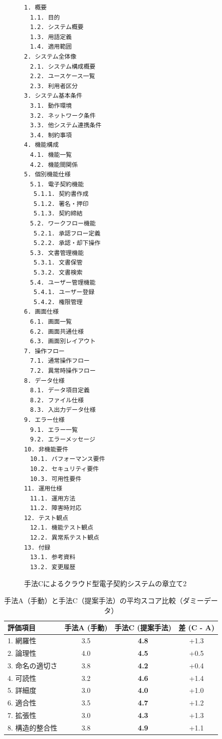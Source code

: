 \begin{figure}[htbp]
\begin{tcolorbox}[
  colback=white,
  colframe=black,
  fonttitle=\bfseries
]
\begin{multicols}{2}
\footnotesize
\ttfamily
\fontsize{11}{12}\selectfont
\begin{verbatim}
1. 概要
　1.1. 目的
　1.2. システム概要
　1.3. 用語定義
　1.4. 適用範囲
2. システム全体像
　2.1. システム構成概要
　2.2. ユースケース一覧
　2.3. 利用者区分
3. システム基本条件
　3.1. 動作環境
　3.2. ネットワーク条件
　3.3. 他システム連携条件
　3.4. 制約事項
4. 機能構成
　4.1. 機能一覧
　4.2. 機能間関係
5. 個別機能仕様
　5.1. 電子契約機能
 　5.1.1. 契約書作成
 　5.1.2. 署名・押印
 　5.1.3. 契約締結
　5.2. ワークフロー機能
 　5.2.1. 承認フロー定義
 　5.2.2. 承認・却下操作
　5.3. 文書管理機能
 　5.3.1. 文書保管
 　5.3.2. 文書検索
　5.4. ユーザー管理機能
 　5.4.1. ユーザー登録
 　5.4.2. 権限管理
6. 画面仕様
　6.1. 画面一覧
　6.2. 画面共通仕様
　6.3. 画面別レイアウト
7. 操作フロー
　7.1. 通常操作フロー
　7.2. 異常時操作フロー
8. データ仕様
　8.1. データ項目定義
　8.2. ファイル仕様
　8.3. 入出力データ仕様
9. エラー仕様
　9.1. エラー一覧
　9.2. エラーメッセージ
10. 非機能要件
　10.1. パフォーマンス要件
　10.2. セキュリティ要件
　10.3. 可用性要件
11. 運用仕様
　11.1. 運用方法
　11.2. 障害時対応
12. テスト観点
　12.1. 機能テスト観点
　12.2. 異常系テスト観点
13. 付録
　13.1. 参考資料
　13.2. 変更履歴
\end{verbatim}
\end{multicols}
\end{tcolorbox}
\caption{手法Cによるクラウド型電子契約システムの章立て2}
\label{fig:C_chapter_structure_of_cloud_contract_system_2}
\end{figure}


\begin{table}[h]
  \caption{手法A（手動）と手法C（提案手法）の平均スコア比較（ダミーデータ）}
  \label{tb:evaluation_result_ac}
  \centering
  \begin{tabular}{|l|c|c|c|}
    \hline
    \textbf{評価項目} & \textbf{手法A (手動)} & \textbf{手法C (提案手法)} & \textbf{差 (C - A)} \\
    \hline\hline
    1. 網羅性 & 3.5 & \textbf{4.8} & +1.3 \\
    \hline
    2. 論理性 & 4.0 & \textbf{4.5} & +0.5 \\
    \hline
    3. 命名の適切さ & 3.8 & \textbf{4.2} & +0.4 \\
    \hline
    4. 可読性 & 3.2 & \textbf{4.6} & +1.4 \\
    \hline
    5. 詳細度 & 3.0 & \textbf{4.0} & +1.0 \\
    \hline
    6. 適合性 & 3.5 & \textbf{4.7} & +1.2 \\
    \hline
    7. 拡張性 & 3.0 & \textbf{4.3} & +1.3 \\
    \hline
    8. 構造的整合性 & 3.8 & \textbf{4.9} & +1.1 \\
    \hline
  \end{tabular}
\end{table}


